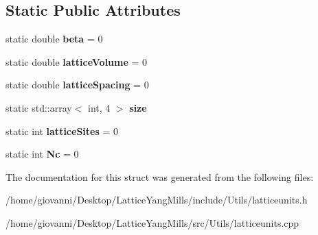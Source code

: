 \subsection*{Static Public Attributes}
\begin{DoxyCompactItemize}
\item 
static double {\bfseries beta} = 0\hypertarget{structLatticeUnits_a07cbe4095d071daafe1068234f11699f}{}\label{structLatticeUnits_a07cbe4095d071daafe1068234f11699f}

\item 
static double {\bfseries lattice\+Volume} = 0\hypertarget{structLatticeUnits_aa04f5342b8d59e53d1e57f8cdae7f1ad}{}\label{structLatticeUnits_aa04f5342b8d59e53d1e57f8cdae7f1ad}

\item 
static double {\bfseries lattice\+Spacing} = 0\hypertarget{structLatticeUnits_ad0f338c6c485987dbe74d86721b2a7d0}{}\label{structLatticeUnits_ad0f338c6c485987dbe74d86721b2a7d0}

\item 
static std\+::array$<$ int, 4 $>$ {\bfseries size}\hypertarget{structLatticeUnits_a47b6abc1f1533e85a206a1dd8c606c22}{}\label{structLatticeUnits_a47b6abc1f1533e85a206a1dd8c606c22}

\item 
static int {\bfseries lattice\+Sites} = 0\hypertarget{structLatticeUnits_a117541e2535e1ee6a027ac582f6fab60}{}\label{structLatticeUnits_a117541e2535e1ee6a027ac582f6fab60}

\item 
static int {\bfseries Nc} = 0\hypertarget{structLatticeUnits_a9307d649e2e898fcfe09d72b04e0aa6c}{}\label{structLatticeUnits_a9307d649e2e898fcfe09d72b04e0aa6c}

\end{DoxyCompactItemize}


The documentation for this struct was generated from the following files\+:\begin{DoxyCompactItemize}
\item 
/home/giovanni/\+Desktop/\+Lattice\+Yang\+Mills/include/\+Utils/latticeunits.\+h\item 
/home/giovanni/\+Desktop/\+Lattice\+Yang\+Mills/src/\+Utils/latticeunits.\+cpp\end{DoxyCompactItemize}
